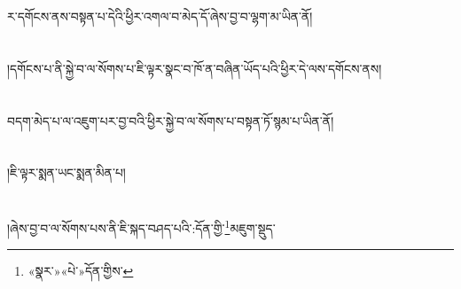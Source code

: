 ར་དགོངས་ནས་བསྟན་པ་དེའི་ཕྱིར་འགལ་བ་མེད་དོ་ཞེས་བྱ་བ་ལྷག་མ་ཡིན་ནོ།\chapter{ }།དགོངས་པ་ནི་སྐྱེ་བ་ལ་སོགས་པ་ཇི་ལྟར་སྣང་བ་ཁོ་ན་བཞིན་ཡོད་པའི་ཕྱིར་དེ་ལས་དགོངས་ནས།\chapter{ }བདག་མེད་པ་ལ་འཇུག་པར་བྱ་བའི་ཕྱིར་སྐྱེ་བ་ལ་སོགས་པ་བསྟན་ཏོ་སྙམ་པ་ཡིན་ནོ།\chapter{ }།ཇི་ལྟར་སྨན་ཡང་སྨན་མིན་པ།\chapter{ }།ཞེས་བྱ་བ་ལ་སོགས་པས་ནི་ཇི་སྐད་བཤད་པའི་:དོན་གྱི་\footnote{«སྣར་»«པེ་»དོན་གྱིས་}མཇུག་སྡུད་\footnot